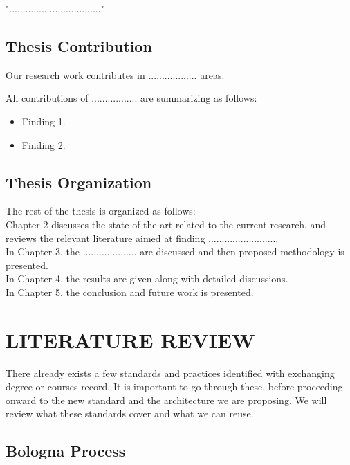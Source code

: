 \documentclass[12pt,a4paper,oneside]{book} %
\begin{document}
".................................."

\section{Thesis Contribution}

Our research work contributes in .................. areas.

All contributions of ................. are summarizing as follows:

\begin{itemize}
\item
Finding 1.
\item
Finding 2.
\end{itemize}

\section{Thesis Organization}

The rest of the thesis is organized as follows: \\

Chapter 2 discusses the state of the art related to the current research, and reviews the relevant literature aimed at finding .......................... \\

In Chapter 3, the .................... are discussed and then proposed methodology is presented. \\

In Chapter 4, the results are given along with detailed discussions. \\

In Chapter 5, the conclusion and future work is presented.

\chapter{LITERATURE REVIEW}\label{c-work}

There already exists a few standards and practices identified with exchanging degree or courses record. It is important to go through these, before proceeding onward to the new standard and the architecture we are proposing. We will review what these standards cover and what we can reuse.

\section{Bologna Process}
\end{document}
